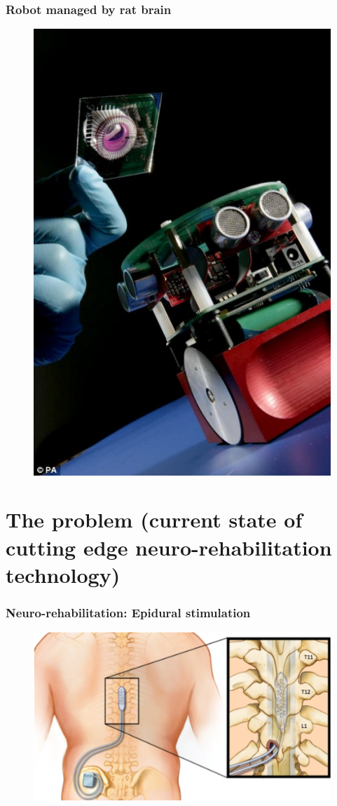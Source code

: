 \documentclass[12pt, aspectratio=169]{beamer}
\begin{document}

\begin{frame}
  \frametitle{Robot managed by rat brain}
  \begin{figure}
    \includegraphics[width=0.35\linewidth]{Miabot}
  \end{figure}
\end{frame}




\section{The problem (current state of cutting edge neuro-rehabilitation technology)}
\begin{frame}
  \frametitle{Neuro-rehabilitation: Epidural stimulation}
  \begin{figure}
    \includegraphics[width=0.6\linewidth]{epidural_stimulation_spinal_cord}
  \end{figure}
\end{frame}
\end{document}
